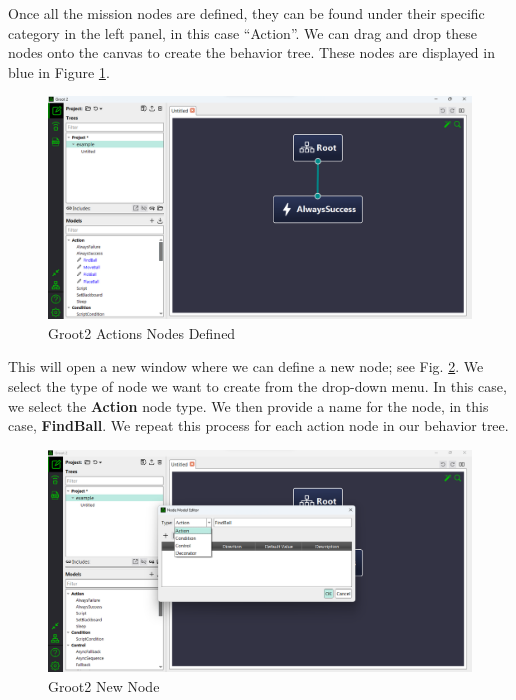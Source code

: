 \documentclass{CSSRforAfrica}
\begin{document}
Once all the mission nodes are defined, they can be found under their specific category in the left panel, in this case ``Action''. We can drag and drop these nodes onto the canvas to create the behavior tree. These nodes are displayed in blue in Figure \ref{fig:groot2_nodesdefined}.


\begin{figure}[H]
    \centering
    \includegraphics[width=120mm]{images/groot2_nodesdefined.png}
    \caption{Groot2 Actions Nodes Defined}
    \label{fig:groot2_nodesdefined}
\end{figure}


This will open a new window where we can define a new node; see Fig. \ref{fig:groo2_new_node}. We select the type of node we want to create from the drop-down menu. In this case, we select the \textbf{Action} node type. We then provide a name for the node, in this case, \textbf{FindBall}. 
We repeat this process for each action node in our behavior tree. 

\begin{figure}[h]
    \centering
    \includegraphics[width=120mm]{images/groot2_newnode.png}
    \caption{Groot2 New Node}
    \label{fig:groo2_new_node}
\end{figure}
\end{document}
